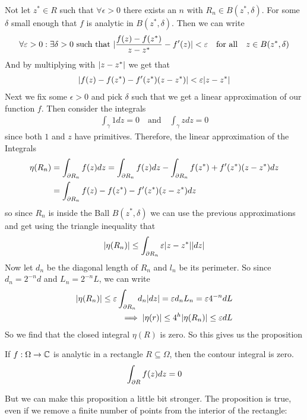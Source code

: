 Not let $z^* \in R$ such that $\forall \epsilon > 0$ there exists an $n$ with $R_n \in B(z^*,\delta)$. For some $\delta$ small enough that $f$ is analytic in $B(z^{\ast},\delta)$. Then we can write
\begin{align*}
	\forall \varepsilon > 0:  \exists \delta > 0 \text{ such that } \vert\frac{f(z) - f(z^*)}{z - z^*} - f'(z)\vert < \varepsilon \quad \text{for all} \quad z \in B(z^*,\delta)
\end{align*}
And by multiplying with $\vert z - z^*\vert$ we get that
\begin{align*}
	\vert f(z) - f(z^*) - f'(z^*)(z-z^*)\vert < \varepsilon \vert z - z^*\vert
\end{align*}
Next we fix some $\epsilon > 0$ and pick $\delta$ such that we get a linear approximation of our function $f$. Then consider the integrals
\begin{align*}
	\int_{\gamma}1 dz = 0 \quad \text{and} \quad \int_{\gamma}z dz = 0
\end{align*}
since both $1$ and $z$ have primitives. Therefore, the linear approximation of the Integrals
\begin{align*}
	\eta(R_n) &= \int_{\partial R_n}f(z) dz = \int_{\partial R_n} f(z) dz - \int_{\partial R_n}f(z^*) + f'(z^*)(z - z^*) dz \\
						&= \int_{\partial R_n} f(z) - f(z^*) - f'(z^*)(z - z^*) dz
\end{align*}
so since $R_n$ is inside the Ball $B(z^*, \delta)$ we can use the previous approximations and get using the triangle inequality that
\begin{align*}
	\vert\eta(R_n)\vert \leq \int_{\partial R_n} \varepsilon \vert z - z^*\vert \vert dz\vert
\end{align*}
Now let $d_n$ be the diagonal length of $R_n$ and $l_n$ be its perimeter. So since $d_n = 2^{-n} d$ and $L_n = 2^{-n} L$, we can write
\begin{align*}
	\vert\eta(R_n)\vert	\leq \varepsilon \int_{\partial R_n} d_n \vert dz\vert = \varepsilon d_n L_n = \varepsilon 4^{-n}dL \\
	\implies \vert\eta(r)\vert \leq 4^h \vert\eta(R_n)\vert \leq \varepsilon dL
\end{align*}
So we find that the closed integral $\eta(R)$ is zero. So this gives us the proposition

\begin{proposition}
	If $f: \Omega \to \mathbb{C}$ is analytic in a rectangle $R \subseteq \Omega$, then the contour integral is zero.
	\begin{align*}
		\int_{\partial R}f(z) dz = 0
	\end{align*}
\end{proposition}
But we can make this proposition a little bit stronger. The proposition is true, even if we remove a finite number of points from the interior of the rectangle:\\

